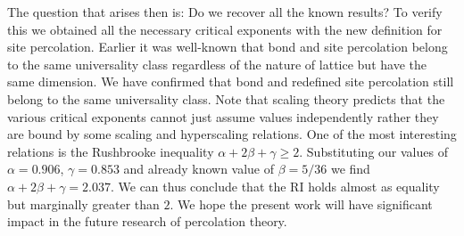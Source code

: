 \documentclass[twocolumn,showpacs,preprintnumbers,amsmath,amssymb]{article}
\begin{document}
The question that arises then is: Do we recover all the known results? To verify
this we obtained all the necessary critical exponents with the new definition for 
site percolation. Earlier it was well-known that bond and site percolation belong to the
same universality class regardless of the nature of lattice but have the same dimension.
We have confirmed that bond and redefined site percolation still belong to the same universality class. 
Note that scaling theory predicts that the various critical exponents cannot just assume values 
independently  rather they are bound by some scaling and hyperscaling relations. One
of the most interesting relations is the Rushbrooke inequality $\alpha+2\beta+\gamma\geq 2$.
Substituting our values of $\alpha=0.906$, $\gamma=0.853$ and already
known value of $\beta=5/36$ we find $\alpha+2\beta+\gamma=2.037$. 
We can thus conclude that the RI holds almost as equality but marginally greater
than $2$. We hope the present work will have significant impact in the future research of percolation
theory.
\end{document}
